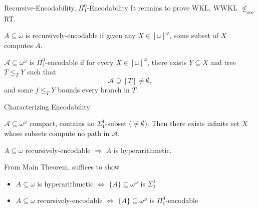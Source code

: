 \begin{frame}{Recursive-Encodability, $\Pi_1^0$-Encodability}
  It remains to prove WKL, WWKL $\nleq_{\text{soc}}$ RT.

  \begin{define}
    $A\subseteq\omega$ is recursively-encodable if given any
    $X\in[\omega]^\omega$, some subset of $X$ computes $A$.
  \end{define}

  \begin{define}
    $\mathcal{A}\subseteq \omega^{\omega}$ is $\Pi_1^0$-encodable if for
    every $X\in[\omega]^\omega$, there exists $Y\subseteq X$ and tree
    $T\leq_T Y$ such that
    \[\mathcal{A} \supseteq [T]\neq\emptyset,\]
    and some $f\leq_T Y$ bounds every branch in $T$.
  \end{define}
\end{frame}

\begin{frame}{Characterizing Encodability}
  \begin{main-thm*}
    $\mathcal{A}\subseteq\omega^{\omega}$ compact, contains no
    $\Sigma_1^1$-subset ($\neq\emptyset$). Then there exists infinite set
    $X$ whose subsets compute no path in $\mathcal{A}$.
  \end{main-thm*}

  \begin{coro*}
    $A\subseteq\omega$ recursively-encodable $\Rightarrow$ $A$ is
    hyperarithmetic.
  \end{coro*}

  \vspace{1em}
  From Main Theorem, suffices to show
  \begin{itemize}
    \item $A\subseteq\omega$ is hyperarithmetic $\Leftrightarrow$
      $\{A\}\subseteq\omega^\omega$ is $\Sigma_1^1$
    \item $A\subseteq\omega$ recursively-encodable $\Leftrightarrow$
      $\{A\}\subseteq\omega^\omega$ is $\Pi_1^0$-encodable
  \end{itemize}
\end{frame}


